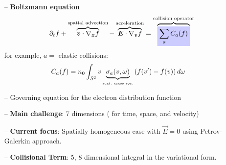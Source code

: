 \documentclass[landscape,archE,fontscale=0.285]{baposter} %
\newcommand{\vect}[1]{\boldsymbol{#1}}
\newcommand{\mathcolorbox}[2]{\colorbox{#1}{$\displaystyle #2$}}
\begin{document}
\begin{poster}
{\begin{itemize}[leftmargin=*]
\item[--] \textbf{Boltzmann equation}
\begin{align*}
\partial_t f + \overbrace{\vect{v}\cdot \nabla_{\vect{x}} f}^{\text{spatial advection}}  - \overbrace{\vect{E} \cdot \nabla_{\vect{v}}f}^{\text{acceleration}} = \overbrace{\mathcolorbox{blue!20}{\sum_{a} C_a(f)}}^{\text{collision operator}}
\end{align*}
for example, $a=$ elastic collisions:
\begin{align*}
C_a(f) &= n_0\int_{S^2} v \underbrace{\sigma_a(v,\omega)}_{\tiny\text{\tiny scat. cross sec.}} 
\left( f(v^\prime) - f(v) \right) d \omega 
\end{align*}
\item[--] Governing equation for the electron distribution function
\item[--] \textbf{Main challenge}: 7 dimensions ( for time, space, and velocity)
\item[--] \textbf{Current focus}: Spatially homogeneous case with $\vec{E}=0$ using Petrov-Galerkin approach. 
\item[--] \textbf{Collisional Term}: 5, 8 dimensional integral in the variational form.


\end{itemize}


}



\end{poster}
\end{document}
